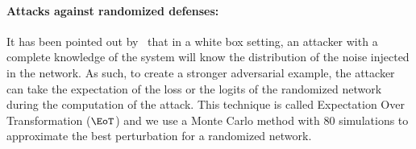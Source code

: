 \paragraph{Attacks against randomized defenses:}
It has been pointed out by~\citet{athalye2017synthesizing,carlini2019evaluating} that in a white box setting, an attacker with a complete knowledge of the system will know the distribution of the noise injected in the network.
As such, to create a stronger adversarial example, the attacker can take the expectation of the loss or the logits of the randomized network during the computation of the attack.
This technique is called Expectation Over Transformation ($\EoT$) and we use a Monte Carlo method with $80$ simulations to approximate the best perturbation for a randomized network. 


